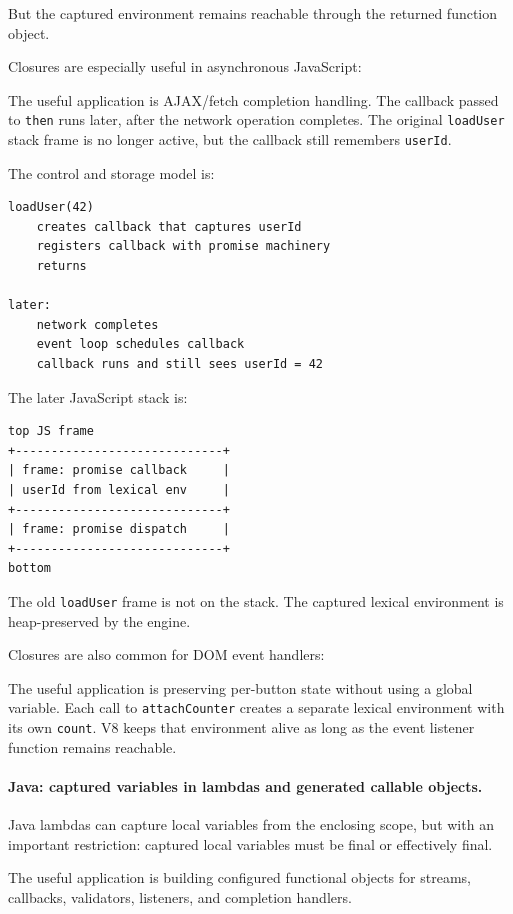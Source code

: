 But the captured environment remains reachable through the returned function object.

Closures are especially useful in asynchronous JavaScript:

The useful application is AJAX/fetch completion handling. The callback passed to \texttt{then} runs later, after the network operation completes. The original \texttt{loadUser} stack frame is no longer active, but the callback still remembers \texttt{userId}.

The control and storage model is:

\begin{verbatim}
loadUser(42)
    creates callback that captures userId
    registers callback with promise machinery
    returns

later:
    network completes
    event loop schedules callback
    callback runs and still sees userId = 42
\end{verbatim}

The later JavaScript stack is:

\begin{verbatim}
top JS frame
+-----------------------------+
| frame: promise callback     |
| userId from lexical env     |
+-----------------------------+
| frame: promise dispatch     |
+-----------------------------+
bottom
\end{verbatim}

The old \texttt{loadUser} frame is not on the stack. The captured lexical environment is heap-preserved by the engine.

Closures are also common for DOM event handlers:

The useful application is preserving per-button state without using a global variable. Each call to \texttt{attachCounter} creates a separate lexical environment with its own \texttt{count}. V8 keeps that environment alive as long as the event listener function remains reachable.

\paragraph{Java: captured variables in lambdas and generated callable objects.}

Java lambdas can capture local variables from the enclosing scope, but with an important restriction: captured local variables must be final or effectively final.

The useful application is building configured functional objects for streams, callbacks, validators, listeners, and completion handlers.

